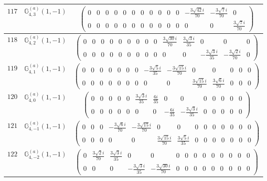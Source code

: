 \documentclass[fleqn,8pt,landscape]{jsarticle}
\begin{document}
\begin{center}
\begin{longtable}{ccc}
$ 117 $ & $ \mathbb{G}_{4,3}^{(a)}(1,-1) $ & $ \begin{pmatrix} 0 & 0 & 0 & 0 & 0 & 0 & 0 & 0 & 0 & 0 & 0 & - \frac{3 \sqrt{42} i}{70} & - \frac{3 \sqrt{7} i}{70} & 0 \\ 0 & 0 & 0 & 0 & 0 & 0 & 0 & 0 & 0 & 0 & 0 & 0 & 0 & \frac{3 \sqrt{7} i}{70} \end{pmatrix} $ \\ \hline
$ 118 $ & $ \mathbb{G}_{4,2}^{(a)}(1,-1) $ & $ \begin{pmatrix} 0 & 0 & 0 & 0 & 0 & 0 & 0 & 0 & 0 & \frac{3 \sqrt{30} i}{70} & \frac{3 \sqrt{3} i}{35} & 0 & 0 & 0 \\ 0 & 0 & 0 & 0 & 0 & 0 & 0 & 0 & 0 & 0 & 0 & - \frac{3 \sqrt{3} i}{35} & - \frac{3 \sqrt{2} i}{70} & 0 \end{pmatrix} $ \\ \hline
$ 119 $ & $ \mathbb{G}_{4,1}^{(a)}(1,-1) $ & $ \begin{pmatrix} 0 & 0 & 0 & 0 & 0 & 0 & 0 & - \frac{3 \sqrt{5} i}{35} & - \frac{3 \sqrt{15} i}{70} & 0 & 0 & 0 & 0 & 0 \\ 0 & 0 & 0 & 0 & 0 & 0 & 0 & 0 & 0 & \frac{3 \sqrt{15} i}{70} & \frac{3 \sqrt{6} i}{70} & 0 & 0 & 0 \end{pmatrix} $ \\ \hline
$ 120 $ & $ \mathbb{G}_{4,0}^{(a)}(1,-1) $ & $ \begin{pmatrix} 0 & 0 & 0 & 0 & 0 & \frac{3 \sqrt{3} i}{35} & \frac{6 i}{35} & 0 & 0 & 0 & 0 & 0 & 0 & 0 \\ 0 & 0 & 0 & 0 & 0 & 0 & 0 & - \frac{6 i}{35} & - \frac{3 \sqrt{3} i}{35} & 0 & 0 & 0 & 0 & 0 \end{pmatrix} $ \\ \hline
$ 121 $ & $ \mathbb{G}_{4,-1}^{(a)}(1,-1) $ & $ \begin{pmatrix} 0 & 0 & 0 & - \frac{3 \sqrt{6} i}{70} & - \frac{3 \sqrt{15} i}{70} & 0 & 0 & 0 & 0 & 0 & 0 & 0 & 0 & 0 \\ 0 & 0 & 0 & 0 & 0 & \frac{3 \sqrt{15} i}{70} & \frac{3 \sqrt{5} i}{35} & 0 & 0 & 0 & 0 & 0 & 0 & 0 \end{pmatrix} $ \\ \hline
$ 122 $ & $ \mathbb{G}_{4,-2}^{(a)}(1,-1) $ & $ \begin{pmatrix} 0 & \frac{3 \sqrt{2} i}{70} & \frac{3 \sqrt{3} i}{35} & 0 & 0 & 0 & 0 & 0 & 0 & 0 & 0 & 0 & 0 & 0 \\ 0 & 0 & 0 & - \frac{3 \sqrt{3} i}{35} & - \frac{3 \sqrt{30} i}{70} & 0 & 0 & 0 & 0 & 0 & 0 & 0 & 0 & 0 \end{pmatrix} $ \\ \hline

\end{longtable}
\end{center}
\end{document}
